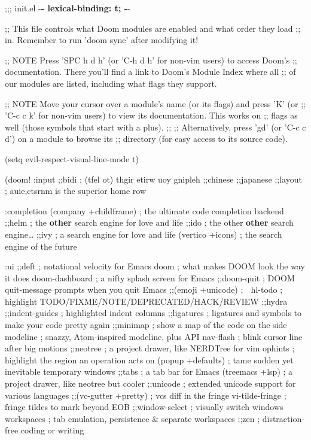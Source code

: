 \documentclass[11pt]{article}
\author{Federico Pontoriero}
\date{\today}
\title{}
\begin{document}
\tableofcontents

;;; init.el -\textbf{- lexical-binding: t; -}-

;; This file controls what Doom modules are enabled and what order they load
;; in. Remember to run 'doom sync' after modifying it!

;; NOTE Press 'SPC h d h' (or 'C-h d h' for non-vim users) to access Doom's
;;      documentation. There you'll find a link to Doom's Module Index where all
;;      of our modules are listed, including what flags they support.

;; NOTE Move your cursor over a module's name (or its flags) and press 'K' (or
;;      'C-c c k' for non-vim users) to view its documentation. This works on
;;      flags as well (those symbols that start with a plus).
;;
;;      Alternatively, press 'gd' (or 'C-c c d') on a module to browse its
;;      directory (for easy access to its source code).

(setq evil-respect-visual-line-mode t)

(doom! :input
       ;;bidi              ; (tfel ot) thgir etirw uoy gnipleh
       ;;chinese
       ;;japanese
       ;;layout            ; auie,ctsrnm is the superior home row

:completion
(company +childframe)           ; the ultimate code completion backend
;;helm              ; the \textbf{other} search engine for love and life
;;ido               ; the other \textbf{other} search engine\ldots{}
;;ivy               ; a search engine for love and life
(vertico +icons)           ; the search engine of the future

:ui
;;deft              ; notational velocity for Emacs
doom              ; what makes DOOM look the way it does
doom-dashboard    ; a nifty splash screen for Emacs
;;doom-quit         ; DOOM quit-message prompts when you quit Emacs
;;(emoji +unicode)  ; 🙂
hl-todo           ; highlight TODO/FIXME/NOTE/DEPRECATED/HACK/REVIEW
;;hydra
;;indent-guides     ; highlighted indent columns
;;ligatures         ; ligatures and symbols to make your code pretty again
;;minimap           ; show a map of the code on the side
modeline          ; snazzy, Atom-inspired modeline, plus API
nav-flash         ; blink cursor line after big motions
;;neotree           ; a project drawer, like NERDTree for vim
ophints           ; highlight the region an operation acts on
(popup +defaults)   ; tame sudden yet inevitable temporary windows
;;tabs              ; a tab bar for Emacs
(treemacs +lsp)          ; a project drawer, like neotree but cooler
;;unicode           ; extended unicode support for various languages
;;(vc-gutter +pretty) ; vcs diff in the fringe
vi-tilde-fringe   ; fringe tildes to mark beyond EOB
;;window-select     ; visually switch windows
workspaces        ; tab emulation, persistence \& separate workspaces
;;zen               ; distraction-free coding or writing
\end{document}
